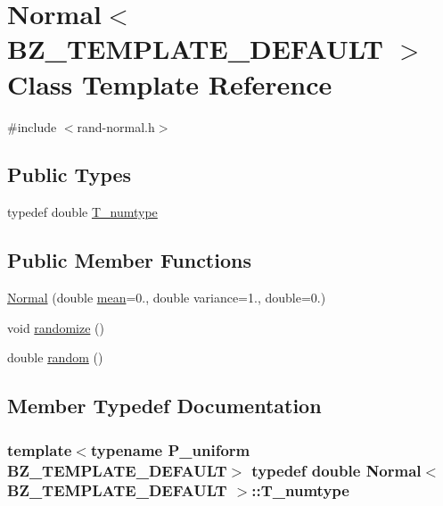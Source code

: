 \hypertarget{classNormal}{}\section{Normal$<$ B\+Z\+\_\+\+T\+E\+M\+P\+L\+A\+T\+E\+\_\+\+D\+E\+F\+A\+U\+L\+T $>$ Class Template Reference}
\label{classNormal}


{\ttfamily \#include $<$rand-\/normal.\+h$>$}

\subsection*{Public Types}
\begin{DoxyCompactItemize}
\item 
typedef double \hyperlink{classNormal_adb906ca01b97f722be42f1aa55febbdc}{T\+\_\+numtype}
\end{DoxyCompactItemize}
\subsection*{Public Member Functions}
\begin{DoxyCompactItemize}
\item 
\hyperlink{classNormal_ad48f902513a206568678e02189a24419}{Normal} (double \hyperlink{vecsum_8cc_a33948e1d26e15588e116726bc52fcca1}{mean}=0., double variance=1., double=0.)
\item 
void \hyperlink{classNormal_a29e7f0f527451b378a410949893e3a5f}{randomize} ()
\item 
double \hyperlink{classNormal_a36d9056940ee96a0452693d31a20b51c}{random} ()
\end{DoxyCompactItemize}


\subsection{Member Typedef Documentation}
\hypertarget{classNormal_adb906ca01b97f722be42f1aa55febbdc}{}
\subsubsection[{T\+\_\+numtype}]{\setlength{\rightskip}{0pt plus 5cm}template$<$typename P\+\_\+uniform  B\+Z\+\_\+\+T\+E\+M\+P\+L\+A\+T\+E\+\_\+\+D\+E\+F\+A\+U\+L\+T$>$ typedef double {\bf Normal}$<$ {\bf B\+Z\+\_\+\+T\+E\+M\+P\+L\+A\+T\+E\+\_\+\+D\+E\+F\+A\+U\+L\+T} $>$\+::{\bf T\+\_\+numtype}}\label{classNormal_adb906ca01b97f722be42f1aa55febbdc}


